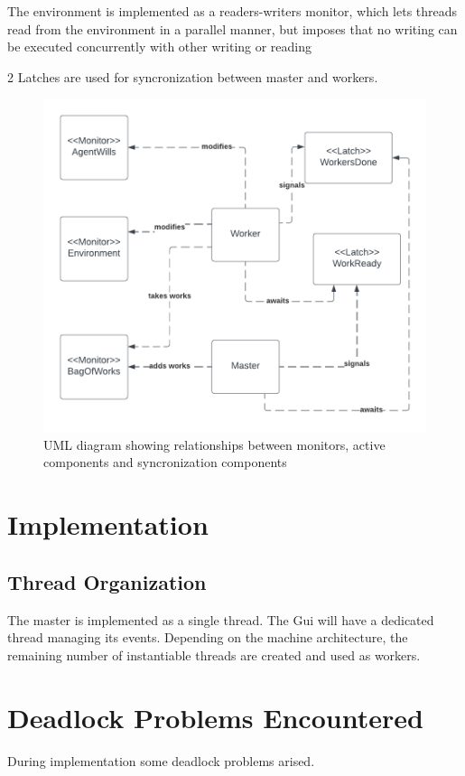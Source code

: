 \documentclass[12pt, a4paper]{report}
\begin{document}
The environment is implemented as a readers-writers monitor, which
 lets threads read from the environment in a parallel manner, but imposes
 that no writing can be executed concurrently with other writing or reading

2 Latches are used for syncronization between master and workers.

\begin{figure}
    \caption{UML diagram showing relationships between monitors, active components and syncronization components}
    \centering
    \includegraphics{UML1.png}
\end{figure}

\chapter{Implementation}
\section{Thread Organization}
The master is implemented as a single thread. The Gui will have a dedicated thread
 managing its events. Depending on the machine architecture, the remaining number
 of instantiable threads are created and used as workers.

\chapter{Deadlock Problems Encountered}
During implementation some deadlock problems arised.
\end{document}
